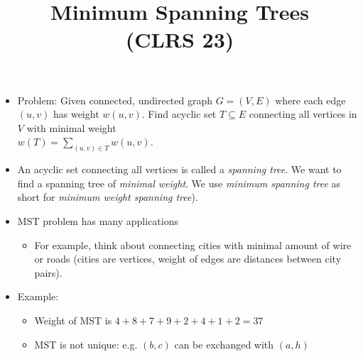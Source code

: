 \documentclass[11pt]{article}
\begin{document}
\title{{\bf Minimum Spanning Trees} \\
\normalsize{(CLRS 23)}}
\date{}

\maketitle


\begin{itemize}
\item Problem: Given connected, undirected graph $G=(V,E)$ where each
  edge $(u,v)$ has weight $w(u,v)$. Find acyclic set $T \subseteq E$
  connecting all vertices in $V$ with minimal weight \\ $w(T) =
  \sum_{(u,v) \in T} w(u,v)$.
\item An acyclic set connecting all vertices is called a {\em spanning
  tree}. We want to find a spanning tree of {\em minimal weight}. We
  use {\em minimum spanning tree} as short for {\em minimum weight
  spanning tree}).
\item MST problem has many applications
  \begin{itemize}
  \item For example, think about connecting cities with minimal
    amount of wire or roads (cities are vertices, weight of edges
    are distances between city pairs).
  \end{itemize}
\item Example: \\
  \centerline{}
  \begin{itemize}
  \item Weight of MST is $4+8+7+9+2+4+1+2=37$
  \item MST is not unique: e.g. $(b,c)$ can be exchanged with $(a,h)$ 
  \end{itemize}
\end{itemize}
\end{document}
